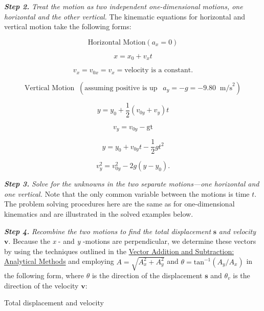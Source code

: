 \documentclass[
]{book}
\begin{document}
\textbf{\emph{Step 2.}} \emph{Treat the motion as two independent one-dimensional
motions, one horizontal and the other vertical.} The kinematic equations
for horizontal and vertical motion take the following forms:

\leavevmode{}%
\[{\text{Horizontal\ Motion}({a_{x} = 0})}{}\]

\leavevmode{}%
\[{{x = {x_{0} + v_{x}}}t}{}\]

\leavevmode{}%
\[{{{v_{x} = v_{0x}} = v_{x}} = \text{velocity\ is\ a\ constant.}}{}\]

\leavevmode{}%
\[{\text{Vertical\ Motion}\operatorname{}(\text{assuming\ positive\ is\ up}\ \operatorname{}{{a_{y} = {- g}} = {{- 9.}\text{80}}}\operatorname{}\text{m/s}^{2})}{}\]

\leavevmode{}%
\[{{y = {y_{0} + \frac{1}{2}}}({v_{0y} + v_{y}})t}{}\]

\leavevmode{}%
\[{v_{y} = {v_{0y} - \text{gt}}}{}\]

\leavevmode{}%
\[{{y = {y_{0} + v_{0y}}}{t - \frac{1}{2}}{gt}^{2}}{}\]

\leavevmode{}%
\[{{v_{y}^{2} = {v_{0y}^{2} - 2g}}({y - y_{0}})\text{.}}{}\]

\textbf{\emph{Step 3.}} \emph{Solve for the unknowns in the two separate motions---one
horizontal and one vertical.} Note that the only common variable between
the motions is time \(t{}\). The problem solving procedures here are the
same as for one-dimensional {kinematics} and are
illustrated in the solved examples below.

\textbf{\emph{Step 4.}} \emph{Recombine the two motions to find the total displacement}
\(\textbf{s}\) \emph{and velocity} \(\textbf{v}{}\). Because the \emph{x} - and \emph{y}
-motions are perpendicular, we determine these vectors by using the
techniques outlined in the \href{/m54783}{Vector Addition and Subtraction: Analytical
Methods} and employing \({A = \sqrt{A_{x}^{2} + A_{y}^{2}}}{}\)
and \({{\theta = \text{tan}^{- 1}}({A_{y}/A_{x}})}{}\) in the following
form, where \(\theta{}\) is the direction of the displacement
\(\mathbf{s}{}\) and \(\theta_{v}{}\) is the direction of the velocity
\(\mathbf{v}{}\):

{Total displacement and velocity}
\end{document}

